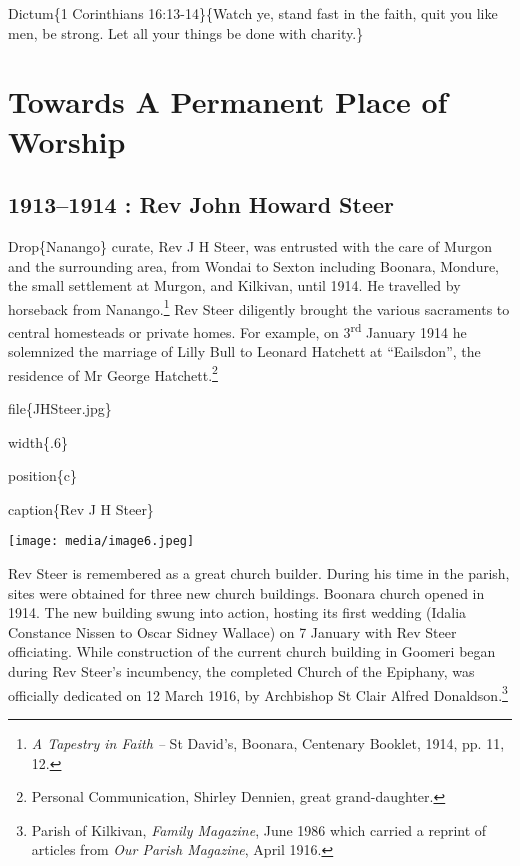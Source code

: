 Dictum\{1 Corinthians 16:13-14\}\{Watch ye, stand fast in the faith, quit you like men, be strong. Let all your things be done with charity.\}

\hypertarget{towards-a-permanent-place-of-worship}{%
\chapter{Towards A Permanent Place of Worship}\label{towards-a-permanent-place-of-worship}}

\hypertarget{rev-john-howard-steer}{%
\section{1913--1914 : Rev John Howard Steer}\label{rev-john-howard-steer}}

Drop\{Nanango\} curate, Rev J H Steer, was entrusted with the care of Murgon and the surrounding area, from Wondai to Sexton including Boonara, Mondure, the small settlement at Murgon, and Kilkivan, until 1914. He travelled by horseback from Nanango.\footnote{\emph{A Tapestry in Faith --} St David's, Boonara, Centenary Booklet, 1914, pp. 11, 12.} Rev Steer diligently brought the various sacraments to central homesteads or private homes. For example, on 3\textsuperscript{rd} January 1914 he solemnized the marriage of Lilly Bull to Leonard Hatchett at ``Eailsdon'', the residence of Mr George Hatchett.\footnote{Personal Communication, Shirley Dennien, great grand-daughter.}

file\{JHSteer.jpg\}

width\{.6\}

position\{c\}

caption\{Rev J H Steer\}

\texttt{[image: media/image6.jpeg]}

Rev Steer is remembered as a great church builder. During his time in the parish, sites were obtained for three new church buildings. Boonara church opened in 1914. The new building swung into action, hosting its first wedding (Idalia Constance Nissen to Oscar Sidney Wallace) on 7 January with Rev Steer officiating. While construction of the current church building in Goomeri began during Rev Steer's incumbency, the completed Church of the Epiphany, was officially dedicated on 12 March 1916, by Archbishop St Clair Alfred Donaldson.\footnote{Parish of Kilkivan, \emph{Family Magazine}, June 1986 which carried a reprint of articles from \emph{Our Parish Magazine}, April 1916.}

